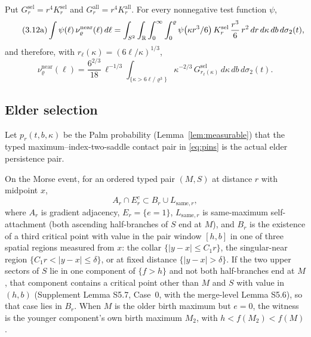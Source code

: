 \begin{proposition}\label{prop:near}
Put $G^{\mathrm{sel}}_r=r^4K^{\mathrm{sel}}_r$ and $G^{\mathrm{all}}_r=r^4K^{\mathrm{all}}_r$. For every nonnegative test function $\psi$,
\begin{equation}\tag{3.12a}
\int\psi(\ell)\,\nu^{\mathrm{near}}_\varrho(\ell)\,d\ell=\int_{S^2}\int_{\mathbb R}\int_0^\infty\int_0^\varrho\psi\bigl(\kappa r^3/6\bigr)\,K^{\mathrm{sel}}_r\,\frac{r^3}{6}\,r^2\,dr\,d\kappa\,db\,d\sigma_2(t),
\end{equation}
and therefore, with $r_\ell(\kappa)=(6\ell/\kappa)^{1/3}$,
\begin{equation}\tag{3.12b}\label{eq:near}
\nu^{\mathrm{near}}_\varrho(\ell)=\frac{6^{2/3}}{18}\,\ell^{-1/3}\int_{\{\kappa>6\ell/\varrho^3\}}\kappa^{-2/3}\,G^{\mathrm{sel}}_{r_\ell(\kappa)}\,d\kappa\,db\,d\sigma_2(t).
\end{equation}
\end{proposition}

\subsection{Elder selection}\label{ssec:selection}

Let $p_r(t,b,\kappa)$ be the Palm probability (Lemma~\ref{lem:measurable}) that the typed maximum--index-two-saddle contact pair in \eqref{eq:pins} is the actual elder persistence pair.

\begin{lemma}\label{lem:trichotomy}
On the Morse event, for an ordered typed pair $(M,S)$ at distance $r$ with midpoint $x$,
\[
A_r\cap E_r^c\subset B_r\cup L_{\mathrm{same},r},
\]
where $A_r$ is gradient adjacency, $E_r=\{e=1\}$, $L_{\mathrm{same},r}$ is same-maximum self-attachment (both ascending half-branches of $S$ end at $M$), and $B_r$ is the existence of a third critical point with value in the pair window $[h,b]$ in one of three spatial regions measured from $x$: the collar $\{|y-x|\le C_1r\}$, the singular-near region $\{C_1r<|y-x|\le\delta\}$, or at fixed distance $\{|y-x|>\delta\}$. If the two upper sectors of $S$ lie in one component of $\{f>h\}$ and not both half-branches end at $M$, that component contains a critical point other than $M$ and $S$ with value in $(h,b)$ (Supplement Lemma S5.7, Case~0, with the merge-level Lemma S5.6), so that case lies in $B_r$. When $M$ is the older birth maximum but $e=0$, the witness is the younger component's own birth maximum $M_2$, with $h<f(M_2)<f(M)$.
\end{lemma}


